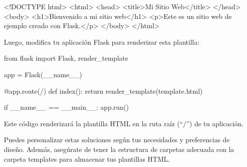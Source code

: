 \documentclass[
  a4paper,
  DIV=11,
  numbers=noendperiod,
  onepage,
  openany]{scrreprt}
\newenvironment{Shaded}{\begin{snugshade}}{\end{snugshade}}
\newcommand{\AttributeTok}[1]{\textcolor[rgb]{0.40,0.45,0.13}{#1}}
\newcommand{\ControlFlowTok}[1]{\textcolor[rgb]{0.00,0.23,0.31}{#1}}
\newcommand{\DataTypeTok}[1]{\textcolor[rgb]{0.68,0.00,0.00}{#1}}
\newcommand{\ImportTok}[1]{\textcolor[rgb]{0.00,0.46,0.62}{#1}}
\newcommand{\KeywordTok}[1]{\textcolor[rgb]{0.00,0.23,0.31}{#1}}
\newcommand{\NormalTok}[1]{\textcolor[rgb]{0.00,0.23,0.31}{#1}}
\newcommand{\OperatorTok}[1]{\textcolor[rgb]{0.37,0.37,0.37}{#1}}
\newcommand{\StringTok}[1]{\textcolor[rgb]{0.13,0.47,0.30}{#1}}
\newcommand{\VariableTok}[1]{\textcolor[rgb]{0.07,0.07,0.07}{#1}}
\begin{document}
\begin{Shaded}
\begin{Highlighting}[]
\DataTypeTok{\textless{}!DOCTYPE }\NormalTok{html}\DataTypeTok{\textgreater{}}
\DataTypeTok{\textless{}}\KeywordTok{html}\DataTypeTok{\textgreater{}}
\DataTypeTok{\textless{}}\KeywordTok{head}\DataTypeTok{\textgreater{}}
    \DataTypeTok{\textless{}}\KeywordTok{title}\DataTypeTok{\textgreater{}}\NormalTok{Mi Sitio Web}\DataTypeTok{\textless{}/}\KeywordTok{title}\DataTypeTok{\textgreater{}}
\DataTypeTok{\textless{}/}\KeywordTok{head}\DataTypeTok{\textgreater{}}
\DataTypeTok{\textless{}}\KeywordTok{body}\DataTypeTok{\textgreater{}}
    \DataTypeTok{\textless{}}\KeywordTok{h1}\DataTypeTok{\textgreater{}}\NormalTok{Bienvenido a mi sitio web}\DataTypeTok{\textless{}/}\KeywordTok{h1}\DataTypeTok{\textgreater{}}
    \DataTypeTok{\textless{}}\KeywordTok{p}\DataTypeTok{\textgreater{}}\NormalTok{Este es un sitio web de ejemplo creado con Flask.}\DataTypeTok{\textless{}/}\KeywordTok{p}\DataTypeTok{\textgreater{}}
\DataTypeTok{\textless{}/}\KeywordTok{body}\DataTypeTok{\textgreater{}}
\DataTypeTok{\textless{}/}\KeywordTok{html}\DataTypeTok{\textgreater{}}
\end{Highlighting}
\end{Shaded}

Luego, modifica tu aplicación Flask para renderizar esta plantilla:

\begin{Shaded}
\begin{Highlighting}[]
\ImportTok{from}\NormalTok{ flask }\ImportTok{import}\NormalTok{ Flask, render\_template}

\NormalTok{app }\OperatorTok{=}\NormalTok{ Flask(}\VariableTok{\_\_name\_\_}\NormalTok{)}

\AttributeTok{@app.route}\NormalTok{(}\StringTok{\textquotesingle{}/\textquotesingle{}}\NormalTok{)}
\KeywordTok{def}\NormalTok{ index():}
    \ControlFlowTok{return}\NormalTok{ render\_template(}\StringTok{\textquotesingle{}template.html\textquotesingle{}}\NormalTok{)}

\ControlFlowTok{if} \VariableTok{\_\_name\_\_} \OperatorTok{==} \StringTok{\textquotesingle{}\_\_main\_\_\textquotesingle{}}\NormalTok{:}
\NormalTok{    app.run()}
\end{Highlighting}
\end{Shaded}

Este código renderizará la plantilla HTML en la ruta raíz (``/'') de tu
aplicación.

Puedes personalizar estas soluciones según tus necesidades y
preferencias de diseño. Además, asegúrate de tener la estructura de
carpetas adecuada con la carpeta templates para almacenar tus plantillas
HTML.
\end{document}
